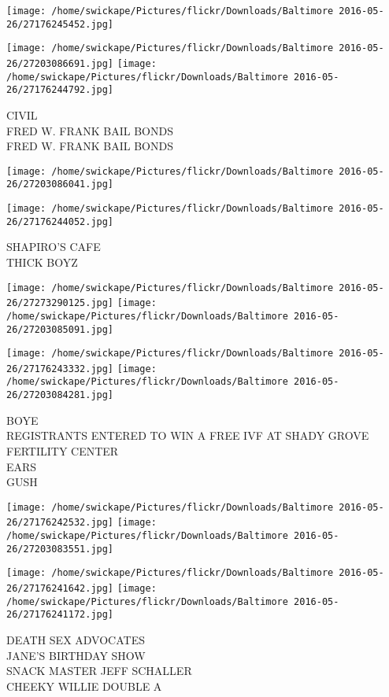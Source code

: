 \documentclass[10pt,letterpaper]{article}
\begin{document}
\texttt{[image: /home/swickape/Pictures/flickr/Downloads/Baltimore 2016-05-26/27176245452.jpg]}

\vspace{0.25in}
\texttt{[image: /home/swickape/Pictures/flickr/Downloads/Baltimore 2016-05-26/27203086691.jpg]}
\texttt{[image: /home/swickape/Pictures/flickr/Downloads/Baltimore 2016-05-26/27176244792.jpg]}

CIVIL\\
FRED W. FRANK BAIL BONDS\\
FRED W. FRANK BAIL BONDS
\pagebreak

\texttt{[image: /home/swickape/Pictures/flickr/Downloads/Baltimore 2016-05-26/27203086041.jpg]}

\vspace{0.25in}
\texttt{[image: /home/swickape/Pictures/flickr/Downloads/Baltimore 2016-05-26/27176244052.jpg]}

SHAPIRO'S CAFE\\
THICK BOYZ
\pagebreak

\texttt{[image: /home/swickape/Pictures/flickr/Downloads/Baltimore 2016-05-26/27273290125.jpg]}
\texttt{[image: /home/swickape/Pictures/flickr/Downloads/Baltimore 2016-05-26/27203085091.jpg]}

\texttt{[image: /home/swickape/Pictures/flickr/Downloads/Baltimore 2016-05-26/27176243332.jpg]}
\texttt{[image: /home/swickape/Pictures/flickr/Downloads/Baltimore 2016-05-26/27203084281.jpg]}

BOYE\\
REGISTRANTS ENTERED TO WIN A FREE IVF AT SHADY GROVE FERTILITY CENTER\\
EARS\\
GUSH
\pagebreak

\texttt{[image: /home/swickape/Pictures/flickr/Downloads/Baltimore 2016-05-26/27176242532.jpg]}
\texttt{[image: /home/swickape/Pictures/flickr/Downloads/Baltimore 2016-05-26/27203083551.jpg]}

\texttt{[image: /home/swickape/Pictures/flickr/Downloads/Baltimore 2016-05-26/27176241642.jpg]}
\texttt{[image: /home/swickape/Pictures/flickr/Downloads/Baltimore 2016-05-26/27176241172.jpg]}

DEATH SEX ADVOCATES\\
JANE'S BIRTHDAY SHOW\\
SNACK MASTER JEFF SCHALLER\\
CHEEKY WILLIE DOUBLE A
\pagebreak
\end{document}
